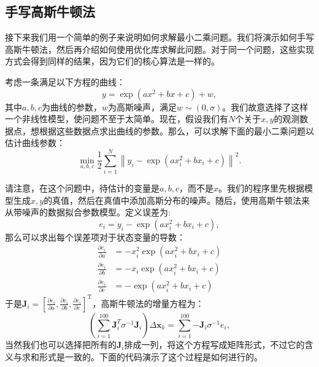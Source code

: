 \subsection{手写高斯牛顿法}
接下来我们用一个简单的例子来说明如何求解最小二乘问题。我们将演示如何手写高斯牛顿法，然后再介绍如何使用优化库求解此问题。对于同一个问题，这些实现方式会得到同样的结果，因为它们的核心算法是一样的。

考虑一条满足以下方程的曲线：
\[
y = \exp( ax^2 + bx + c ) + w,
\]
其中$a,b,c$为曲线的参数，$w$为高斯噪声，满足$w \sim (0, \sigma)$。我们故意选择了这样一个非线性模型，使问题不至于太简单。现在，假设我们有$N$个关于$x,y$的观测数据点，想根据这些数据点求出曲线的参数。那么，可以求解下面的最小二乘问题以估计曲线参数：
\begin{equation}
\min \limits_{a,b,c} \frac{1}{2}\sum\limits_{i = 1}^N {{{\left\| {{y_i} - \exp \left( {ax_i^2 + bx_i + c} \right)} \right\|}^2}} .
\end{equation}

请注意，在这个问题中，待估计的变量是$a,b,c$，而不是$x$。我们的程序里先根据模型生成$x,y$的真值，然后在真值中添加高斯分布的噪声。随后，使用高斯牛顿法来从带噪声的数据拟合参数模型。定义误差为:
\begin{equation}
e_i = y_i - \exp \left( {ax_i^2 + bx_i + c} \right),
\end{equation}
那么可以求出每个误差项对于状态变量的导数：
\begin{equation}
\begin{aligned}
\frac{{\partial {e_i}}}{{\partial a}} &=  - x_i^2\exp \left( {ax_i^2 + b{x_i} + c} \right)\\
\frac{{\partial e_i}}{{\partial b}} &=  - {x_i}\exp \left( {ax_i^2 + b{x_i} + c} \right)\\
\frac{{\partial {e_i}}}{{\partial c}} &=  - \exp \left( {ax_i^2 + b{x_i} + c} \right)
\end{aligned}
\end{equation}
于是$\bm{J}_i = \left[\frac{{\partial {e_i}}}{{\partial a}},\frac{{\partial {e_i}}}{{\partial b}},\frac{{\partial {e_i}}}{{\partial c}} \right]^\mathrm{T}$，高斯牛顿法的增量方程为：
\begin{equation}
\left(\sum\limits_{i = 1}^{100} {\bm{J}_i^T{\sigma ^{ - 1}}{\bm{J}_i}} \right) \Delta \bm{x}_k = \sum\limits_{i = 1}^{100} { - {\bm{J}_i}{\sigma ^{ - 1}}{e_i}},
\end{equation}
当然我们也可以选择把所有的$\bm{J}_i$排成一列，将这个方程写成矩阵形式，不过它的含义与求和形式是一致的。下面的代码演示了这个过程是如何进行的。





